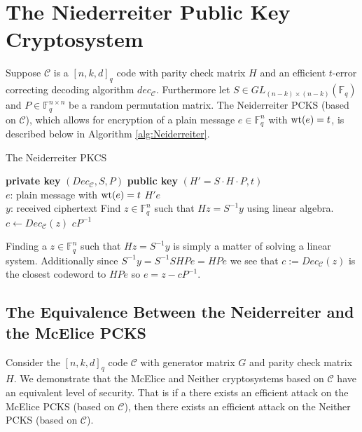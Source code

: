 \section{The Niederreiter Public Key Cryptosystem}

Suppose $\mathcal{C}$ is a $[n, k, d]_q$ code with parity check matrix $H$ and an efficient $t$-error correcting decoding algorithm $dec_{\mathcal{C}}$. Furthermore let $S \in GL_{(n - k) \times (n - k)}(\mathbb{F}_q)$ and $P \in \mathbb{F}_q^{n \times n}$ be a random permutation matrix. The Neiderreiter PCKS (based on $\mathcal{C}$), which allows for encryption of a plain message $e \in \mathbb{F}_q^n$ with $\mathrm{wt}(e) = t$, is described below in Algorithm \ref{alg:Neiderreiter}.

\begin{algorithm}
\caption{The Neiderreiter PKCS}\label{alg:Neiderreiter}
\begin{algorithmic}
  \State \textbf{private key} $(Dec_{\mathcal{C}}, S, P)$
  \State \textbf{public key} $(H' = S \cdot H \cdot P, t)$
  \\
   {$e$: plain message with $\mathrm{wt}(e) = t$}
    \State \Return $H'e$
  \EndProcedure \\
   {$y$: received ciphertext}
    \State Find $z \in \mathbb{F}_q^n$ such that $Hz = S^{-1}y$ using linear algebra.
    \State $c \gets Dec_{\mathcal{C}}(z)$
    \State \Return $c P^{-1}$
  \EndProcedure
\end{algorithmic}
\end{algorithm}

Finding a $z \in \mathbb{F}_q^{n}$ such that $Hz = S^{-1}y$ is simply a matter of solving a linear system. Additionally since $S^{-1}y = S^{-1}SHPe = HPe$ we see that $c := Dec_{\mathcal{C}}(z)$ is the closest codeword to $HPe$ so $e = z - c P^{-1}$.

\subsection{The Equivalence Between the Neiderreiter and the McElice PCKS}%

Consider the $[n, k, d]_{q}$ code $\mathcal{C}$ with generator matrix $G$ and parity check matrix $H$. We demonstrate that the McElice and Neither cryptosystems based on $\mathcal{C}$ have an equivalent level of security. That is if a there exists an efficient attack on the McElice PCKS (based on $\mathcal{C}$), then there exists an efficient attack on the Neither PCKS (based on $\mathcal{C}$).


